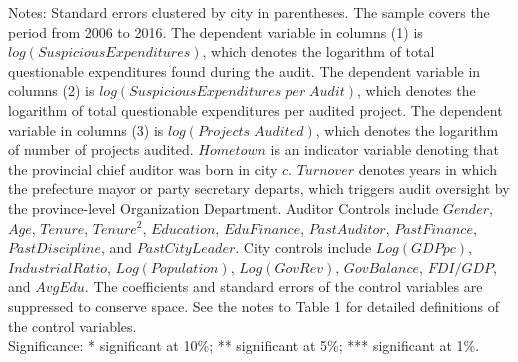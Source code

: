 \begin{table}[p]
\begin{threeparttable}
\begin{tablenotes}
\item Notes: Standard errors clustered by city in parentheses. The sample covers the period from 2006 to 2016. The dependent variable in columns (1) is $ log(SuspiciousExpenditures) $, which denotes the logarithm of total questionable expenditures found during the audit. The dependent variable in columns (2) is $ log(SuspiciousExpenditures \; per \;Audit) $, which denotes the logarithm of total questionable expenditures per audited project. The dependent variable in columns (3) is $ log(Projects \; Audited) $, which denotes the logarithm of number of projects audited. $ Hometown $ is an indicator variable denoting that the provincial chief auditor was born in city $ c $. $ Turnover $ denotes years in which the prefecture mayor or party secretary departs, which triggers audit oversight by the province-level Organization Department. Auditor Controls include $ Gender $, $ Age $, $ Tenure $, $ Tenure^2 $, $ Education $, $ EduFinance $, $ PastAuditor $, $ PastFinance $, $ PastDiscipline $, and $ PastCityLeader $. City controls include $ Log(GDP pc) $, $ IndustrialRatio $, $ Log(Population) $, $ Log(GovRev) $, $ GovBalance $, $ FDI/GDP $, and $ AvgEdu $. The coefficients and standard errors of the control variables are suppressed to conserve space. See the notes to Table 1 for detailed definitions of the control variables.   \\  Significance: * significant at 10\%; ** significant at 5\%; *** significant at 1\%.
\end{tablenotes}
\end{threeparttable}\end{table}
